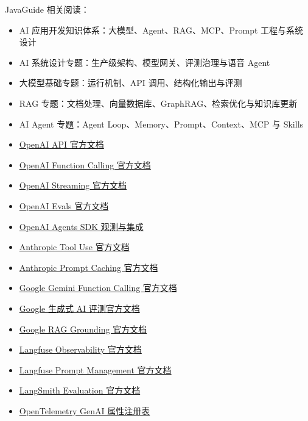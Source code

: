 \documentclass[9pt,a4paper,twocolumn]{ctexart}
\begin{document}
JavaGuide 相关阅读：


\begin{itemize}[itemsep=1pt, topsep=2pt]
  \item AI 应用开发知识体系：大模型、Agent、RAG、MCP、Prompt 工程与系统设计
  \item AI 系统设计专题：生产级架构、模型网关、评测治理与语音 Agent
  \item 大模型基础专题：运行机制、API 调用、结构化输出与评测
  \item RAG 专题：文档处理、向量数据库、GraphRAG、检索优化与知识库更新
  \item AI Agent 专题：Agent Loop、Memory、Prompt、Context、MCP 与 Skills
  \item \href{https://developers.openai.com/api/docs}{OpenAI API 官方文档}
  \item \href{https://developers.openai.com/api/docs/guides/function-calling}{OpenAI Function Calling 官方文档}
  \item \href{https://developers.openai.com/api/docs/guides/streaming-responses}{OpenAI Streaming 官方文档}
  \item \href{https://developers.openai.com/api/docs/guides/evals}{OpenAI Evals 官方文档}
  \item \href{https://developers.openai.com/api/docs/guides/agents/integrations-observability}{OpenAI Agents SDK 观测与集成}
  \item \href{https://platform.claude.com/docs/en/agents-and-tools/tool-use/overview}{Anthropic Tool Use 官方文档}
  \item \href{https://platform.claude.com/docs/en/build-with-claude/prompt-caching}{Anthropic Prompt Caching 官方文档}
  \item \href{https://docs.cloud.google.com/gemini-enterprise-agent-platform/models/tools/function-calling}{Google Gemini Function Calling 官方文档}
  \item \href{https://docs.cloud.google.com/gemini-enterprise-agent-platform/models/evaluation-overview}{Google 生成式 AI 评测官方文档}
  \item \href{https://docs.cloud.google.com/gemini-enterprise-agent-platform/models/grounding/ground-responses-using-rag}{Google RAG Grounding 官方文档}
  \item \href{https://langfuse.com/docs/observability/overview}{Langfuse Observability 官方文档}
  \item \href{https://langfuse.com/docs/prompt-management/overview}{Langfuse Prompt Management 官方文档}
  \item \href{https://docs.langchain.com/langsmith/evaluation}{LangSmith Evaluation 官方文档}
  \item \href{https://opentelemetry.io/docs/specs/semconv/registry/attributes/gen-ai/}{OpenTelemetry GenAI 属性注册表}
\end{itemize}
\end{document}
